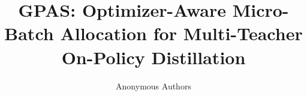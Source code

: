 \documentclass{article} %
\title{GPAS: Optimizer-Aware Micro-Batch Allocation for Multi-Teacher On-Policy Distillation}
\author{Anonymous Authors}
\theoremstyle{remark}
\begin{document}
\maketitle













\appendix

\setcounter{table}{0}
\renewcommand{\thetable}{A\arabic{table}}


\end{document}

